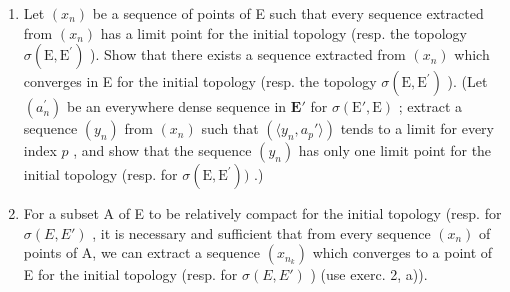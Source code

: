 \begin{enumerate}
\def\labelenumi{\alph{enumi})}
\setcounter{enumi}{1}
\item
  Let \((x_{n})\) be a sequence of points of E such that every sequence extracted from \((x_{n})\) has a limit point for the initial topology (resp. the topology \(\sigma (\mathrm{E},\mathrm{E}^{\prime})\) ). Show that there exists a sequence extracted from \((x_{n})\) which converges in E for the initial topology (resp. the topology \(\sigma (\mathrm{E},\mathrm{E}^{\prime})\) ). (Let \((a_n^{\prime})\) be an everywhere dense sequence in \(\mathbf{E}'\) for \(\sigma (\mathrm{E}',\mathrm{E})\) ; extract a sequence \((y_{n})\) from \((x_{n})\) such that \((\langle y_n,a_p'\rangle)\) tends to a limit for every index \(p\) , and show that the sequence \((y_{n})\) has only one limit point for the initial topology (resp. for \(\sigma (\mathrm{E},\mathrm{E}^{\prime}))\) .)
\item
  For a subset A of E to be relatively compact for the initial topology (resp. for \(\sigma(E, E')\) , it is necessary and sufficient that from every sequence \((x_n)\) of points of A, we can extract a sequence \((x_{n_k})\) which converges to a point of E for the initial topology (resp. for \(\sigma(E, E')\) ) (use exerc. 2, a)).
\end{enumerate}

